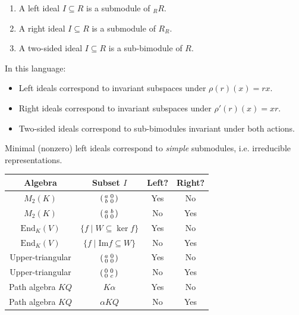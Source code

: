 \begin{proposition}
\leavevmode
\begin{enumerate}
    \item A left ideal $I\subseteq R$ is a submodule of ${}_R R$.
    \item A right ideal $I\subseteq R$ is a submodule of $R_R$.
    \item A two-sided ideal $I\subseteq R$ is a sub-bimodule of $R$.
\end{enumerate}
\end{proposition}

\begin{remark}
In this language:
\begin{itemize}
    \item Left ideals correspond to invariant subspaces under $\rho(r)(x)=rx$.
    \item Right ideals correspond to invariant subspaces under $\rho'(r)(x)=xr$.
    \item Two-sided ideals correspond to sub-bimodules invariant under both actions.
\end{itemize}
Minimal (nonzero) left ideals correspond to \emph{simple} submodules, i.e. irreducible representations.
\end{remark}

\begin{center}
\renewcommand{\arraystretch}{1.4}
\begin{tabular}{|c|c|c|c|}
\hline
\textbf{Algebra} & \textbf{Subset $I$} & \textbf{Left?} & \textbf{Right?} \\
\hline
$M_2(K)$ & $\begin{psmallmatrix} a & 0 \\ b & 0 \end{psmallmatrix}$ & Yes & No \\[3pt]
$M_2(K)$ & $\begin{psmallmatrix} a & b \\ 0 & 0 \end{psmallmatrix}$ & No & Yes \\[3pt]
$\mathrm{End}_K(V)$ & $\{f\mid W\subseteq\ker f\}$ & Yes & No \\[3pt]
$\mathrm{End}_K(V)$ & $\{f\mid \mathrm{Im}f\subseteq W\}$ & No & Yes \\[3pt]
Upper-triangular & $\begin{psmallmatrix} a & 0\\ 0 & 0\end{psmallmatrix}$ & Yes & No \\[3pt]
Upper-triangular & $\begin{psmallmatrix} 0 & 0\\ 0 & c\end{psmallmatrix}$ & No & Yes \\[3pt]
Path algebra $KQ$ & $K\alpha$ & Yes & No \\[3pt]
Path algebra $KQ$ & $\alpha KQ$ & No & Yes \\
\hline
\end{tabular}
\end{center}

